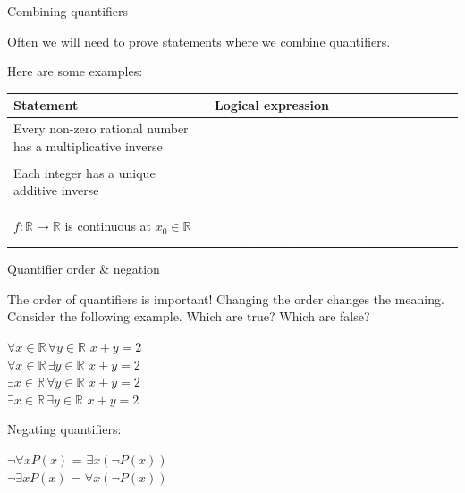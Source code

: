 \documentclass [aspectratio=169]{beamer}
\newcommand{\R}{{\mathbb{R}}}
\newcommand{\Z}{{\mathbb{Z}}}
\newcommand{\Q}{{\mathbb{Q}}}
\begin{document}
\begin{frame}{Combining quantifiers}

Often we will need to prove statements where we combine quantifiers.

Here are some examples:
\vspace{1em}


\begin{tabular}{p{} p{}}
     Statement & Logical expression \\
     \hline
     Every non-zero rational number has a multiplicative inverse &  \textcolor{white}{$\forall q \in \Q \setminus \{0\}, \, \exists s \in \Q$ such that $qs=1$} \\
          & \\
     Each integer has a unique additive inverse &  \textcolor{white}{$\forall x \in \Z \, , \exists ! y \in \Z$ such that $x+y = 0$} \\
          & \\
     $f:\R \to \R$ is continuous at $x_0\in\R$ \ &  \textcolor{white}{$\forall \epsilon >0 \; \exists \delta > 0$ such that whenever $|x - x_0| < \delta$, $|f(x)-f(x_0)| < \epsilon$}
\end{tabular}

\end{frame}

\begin{frame}{Quantifier order \& negation}

The order of quantifiers is important! Changing the order changes the meaning. Consider the following example. Which are true? Which are false?

\begin{center}

$\forall x \in \R \, \forall y \in \R$  $x + y = 2$ \\
$\forall x \in \R \, \exists y \in \R$  $x + y = 2$ \\
$\exists x \in \R \, \forall y \in \R$  $x + y = 2$ \\
$\exists x \in \R \, \exists y \in \R$ $x + y = 2$ 
\end{center}
\vspace{1em}


Negating quantifiers:


\begin{center}
    $\neg \forall x P(x)$ = $\exists x (\neg P(x))$ \\
$\neg \exists x P(x)$ = $\forall x (\neg P(x))$
\end{center}
\end{frame}
\end{document}

